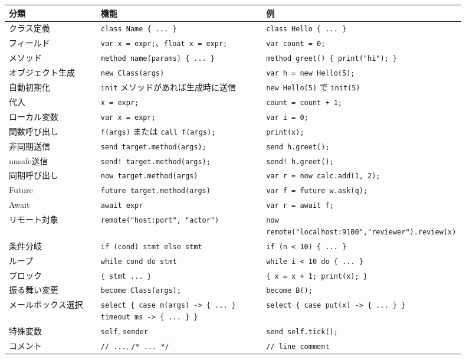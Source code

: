 \documentclass[11pt,a4paper,uplatex,dvipdfmx]{jsarticle}
\begin{document}
\begin{longtable}{p{0.20\linewidth}p{0.36\linewidth}p{0.34\linewidth}}
\toprule
分類 & 機能 & 例 \\
\midrule
クラス定義 & \texttt{class Name \{ ... \}} & \texttt{class Hello \{ ... \}} \\
フィールド & \texttt{var x = expr;}、\texttt{float x = expr;} & \texttt{var count = 0;} \\
メソッド & \texttt{method name(params) \{ ... \}} & \texttt{method greet() \{ print("hi"); \}} \\
オブジェクト生成 & \texttt{new Class(args)} & \texttt{var h = new Hello(5);} \\
自動初期化 & \texttt{init} メソッドがあれば生成時に送信 & \texttt{new Hello(5)} で \texttt{init(5)} \\
代入 & \texttt{x = expr;} & \texttt{count = count + 1;} \\
ローカル変数 & \texttt{var x = expr;} & \texttt{var i = 0;} \\
関数呼び出し & \texttt{f(args)} または \texttt{call f(args);} & \texttt{print(x);} \\
非同期送信 & \texttt{send target.method(args);} & \texttt{send h.greet();} \\
unsafe送信 & \texttt{send! target.method(args);} & \texttt{send! h.greet();} \\
同期呼び出し & \texttt{now target.method(args)} & \texttt{var r = now calc.add(1, 2);} \\
Future & \texttt{future target.method(args)} & \texttt{var f = future w.ask(q);} \\
Await & \texttt{await expr} & \texttt{var r = await f;} \\
リモート対象 & \texttt{remote("host:port", "actor")} & \texttt{now remote("localhost:9100","reviewer").review(x)} \\
条件分岐 & \texttt{if (cond) stmt else stmt} & \texttt{if (n < 10) \{ ... \}} \\
ループ & \texttt{while cond do stmt} & \texttt{while i < 10 do \{ ... \}} \\
ブロック & \texttt{\{ stmt ... \}} & \texttt{\{ x = x + 1; print(x); \}} \\
振る舞い変更 & \texttt{become Class(args);} & \texttt{become B();} \\
メールボックス選択 & \texttt{select \{ case m(args) -> \{ ... \} timeout ms -> \{ ... \} \}} & \texttt{select \{ case put(x) -> \{ ... \} \}} \\
特殊変数 & \texttt{self}, \texttt{sender} & \texttt{send self.tick();} \\
コメント & \texttt{// ...}, \texttt{/* ... */} & \texttt{// line comment} \\
\bottomrule
\end{longtable}
\end{document}
